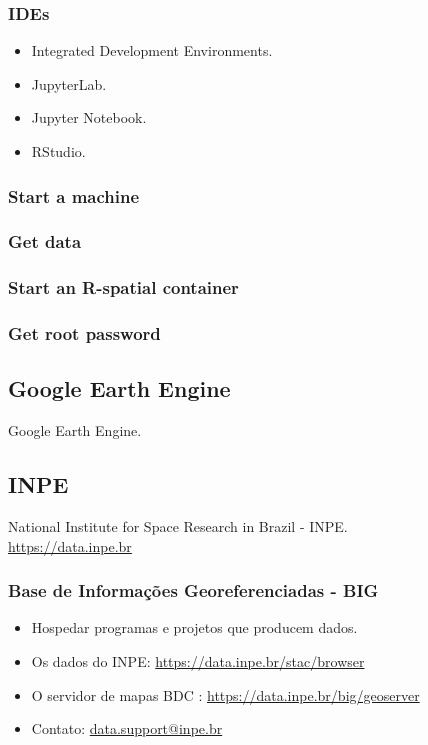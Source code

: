 \documentclass[aspectratio=169]{beamer}
\begin{document}
\begin{frame}
    \frametitle{IDEs}
    \begin{itemize}
        \item Integrated Development Environments.
        \item JupyterLab.
        \item Jupyter Notebook.
        \item RStudio.
    \end{itemize}
\end{frame}

\begin{frame}
    \frametitle{Start a machine}
\end{frame}

\begin{frame}
    \frametitle{Get data}
\end{frame}

\begin{frame}
   \frametitle{Start an R-spatial container} 
\end{frame}

\begin{frame}
   \frametitle{Get root password} 
\end{frame}


\subsection{Google Earth Engine}

\begin{frame}
    Google Earth Engine.
\end{frame}


\subsection{INPE}

\begin{frame}
    National Institute for Space Research in Brazil - INPE.\\
    \url{https://data.inpe.br}
\end{frame}

\begin{frame}
    \frametitle{Base de Informações Georeferenciadas - BIG}
    \begin{itemize}
        \item Hospedar programas e projetos que producem dados.
        \item Os dados do INPE: \url{https://data.inpe.br/stac/browser}
        \item O servidor de mapas BDC : \url{https://data.inpe.br/big/geoserver}
        \item Contato: \href{mailto:[data.support@inpe.br]}{data.support@inpe.br}
    \end{itemize}
\end{frame}
\end{document}
